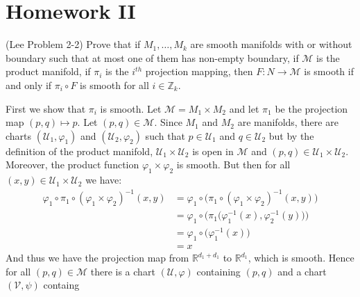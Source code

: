 \documentclass{article}                                                        %
\begin{document}
    \section{Homework II}
        \begin{problem}
            (Lee Problem 2-2) Prove that if $M_{1},\dots,M_{k}$ are smooth
            manifolds with or without boundary such that at most one of them has
            non-empty boundary, if $\mathcal{M}$ is the product manifold, if
            $\pi_{i}$ is the $i^{th}$ projection mapping, then
            $F:N\rightarrow\mathcal{M}$ is smooth if and only if
            $\pi_{i}\circ{F}$ is smooth for all $i\in\mathbb{Z}_{k}$.
        \end{problem}
        \begin{solution}
            First we show that $\pi_{i}$ is smooth. Let
            $\mathcal{M}=M_{1}\times{M}_{2}$ and let $\pi_{1}$ be the projection
            map $(p,q)\mapsto{p}$. Let $(p,q)\in\mathcal{M}$. Since
            $M_{1}$ and $M_{2}$ are manifolds, there are charts
            $(\mathcal{U}_{1},\varphi_{1})$ and $(\mathcal{U}_{2},\varphi_{2})$
            such that $p\in\mathcal{U}_{1}$ and $q\in\mathcal{U}_{2}$ but by the
            definition of the product manifold,
            $\mathcal{U}_{1}\times\mathcal{U}_{2}$ is open in $\mathcal{M}$ and
            $(p,q)\in\mathcal{U}_{1}\times\mathcal{U}_{2}$. Moreover, the
            product function $\varphi_{1}\times\varphi_{2}$ is smooth. But then
            for all $(x,y)\in\mathcal{U}_{1}\times\mathcal{U}_{2}$ we have:
            \begin{align}
                \varphi_{1}\circ\pi_{1}\circ
                    (\varphi_{1}\times\varphi_{2})^{\minus{1}}(x,y)
                &=\varphi_{1}\circ\big(
                    \pi_{1}\circ(\varphi_{1}\times\varphi_{2})^{\minus{1}}(x,y)
                \big)\\
                &=\varphi_{1}\circ\Big(
                    \pi_{1}\big(\varphi_{1}^{\minus{1}}(x),
                                \varphi_{2}^{\minus{1}}(y)\big)\Big)\\
                &=\varphi_{1}\circ\big(\varphi_{1}^{\minus{1}}(x)\big)\\
                &=x
            \end{align}
            And thus we have the projection map from $\mathbb{R}^{d_{1}+d_{1}}$
            to $\mathbb{R}^{d_{1}}$, which is smooth. Hence for all
            $(p,q)\in\mathcal{M}$ there is a chart $(\mathcal{U},\varphi)$
            containing $(p,q)$ and a chart $(\mathcal{V},\psi)$ containg

\end{solution}
\end{document}
